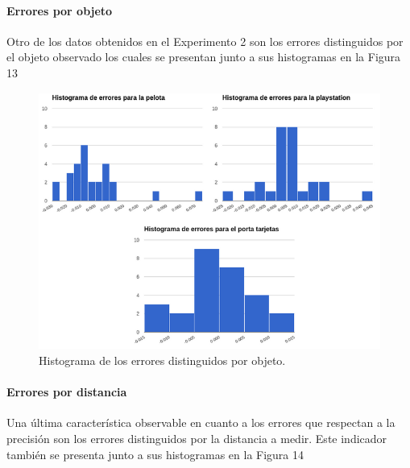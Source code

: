 \documentclass[11pt,a4paper,titlepage]{article}
\newcommand{\Figure}[1]{Figura #1}
\begin{document}
\paragraph{Errores por objeto}
\hfill \break

Otro de los datos obtenidos en el Experimento 2 son los errores distinguidos por el objeto observado los cuales se presentan junto a sus histogramas en la \Figure{13}


\begin{figure}[h!]

  \centering
    \includegraphics[width=1\textwidth]{f13.png}
  \caption{Histograma de los errores distinguidos por objeto.}
\end{figure}

\paragraph{Errores por distancia}
\hfill \break

Una última característica observable en cuanto a los errores que respectan a la precisión son los errores distinguidos por la distancia a medir. Este indicador también se presenta junto a sus histogramas en la \Figure{14}

\end{document}
